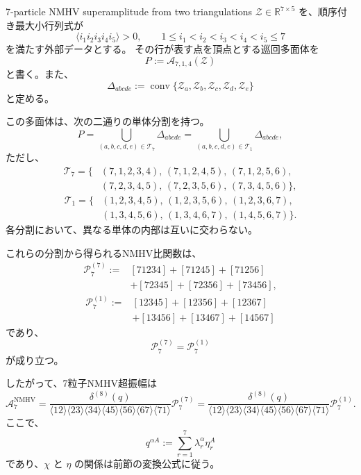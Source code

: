 \documentclass[uplatex,dvipdfmx,a4paper,11pt]{jsarticle}
\numberwithin{equation}{section}
\begin{document}
\begin{mythm}{7-particle NMHV superamplitude from two triangulations}
  $\mathcal Z\in\mathbb R^{7\times5}$ を、順序付き最大小行列式が
  \[
    \langle i_1i_2i_3i_4i_5\rangle>0,
    \qquad
    1\leq i_1<i_2<i_3<i_4<i_5\leq7
  \]
  を満たす外部データとする。
  その行が表す点を頂点とする巡回多面体を
  \[
    P:=\mathcal A_{7,1,4}(\mathcal Z)
  \]
  と書く。また、
  \[
    \Delta_{abcde}
      :=\operatorname{conv}
      \{\mathcal Z_a,\mathcal Z_b,\mathcal Z_c,
        \mathcal Z_d,\mathcal Z_e\}
  \]
  と定める。

  この多面体は、次の二通りの単体分割を持つ。
  \[
    P=
    \bigcup_{(a,b,c,d,e)\in\mathcal T_7}
    \Delta_{abcde}
    =
    \bigcup_{(a,b,c,d,e)\in\mathcal T_1}
    \Delta_{abcde},
  \]
  ただし、
  \[
    \begin{aligned}
      \mathcal T_7
      =\{&
        (7,1,2,3,4),\,
        (7,1,2,4,5),\,
        (7,1,2,5,6),\\
        & (7,2,3,4,5),\,
        (7,2,3,5,6),\,
        (7,3,4,5,6)
      \},
    \end{aligned}
  \]
  \[
    \begin{aligned}
      \mathcal T_1
      =\{&
        (1,2,3,4,5),\,
        (1,2,3,5,6),\,
        (1,2,3,6,7),\\
        & (1,3,4,5,6),\,
        (1,3,4,6,7),\,
        (1,4,5,6,7)
      \}.
    \end{aligned}
  \]
  各分割において、異なる単体の内部は互いに交わらない。

  これらの分割から得られるNMHV比関数は、
  \[
    \begin{aligned}
      \mathcal P_7^{(7)}
      :={}&
        [71234]+[71245]+[71256]\\
        &+[72345]+[72356]+[73456],
    \end{aligned}
  \]
  \[
    \begin{aligned}
      \mathcal P_7^{(1)}
      :={}&
        [12345]+[12356]+[12367]\\
        &+[13456]+[13467]+[14567]
    \end{aligned}
  \]
  であり、
  \[
    \mathcal P_7^{(7)}=\mathcal P_7^{(1)}
  \]
  が成り立つ。

  したがって、7粒子NMHV超振幅は
  \[
    \boxed{
      \mathcal A_7^{\mathrm{NMHV}}
        =
        \frac{\delta^{(8)}(q)}{
          \langle12\rangle\langle23\rangle
          \langle34\rangle\langle45\rangle
          \langle56\rangle\langle67\rangle
          \langle71\rangle
        }\mathcal P_7^{(7)}
        =
        \frac{\delta^{(8)}(q)}{
          \langle12\rangle\langle23\rangle
          \langle34\rangle\langle45\rangle
          \langle56\rangle\langle67\rangle
          \langle71\rangle
        }\mathcal P_7^{(1)}.
    }
  \]
  ここで、
  \[
    q^{\alpha A}
      :=\sum_{r=1}^{7}\lambda_r^\alpha\eta_r^A
  \]
  であり、$\chi$ と $\eta$ の関係は前節の変換公式に従う。
\end{mythm}
\end{document}
